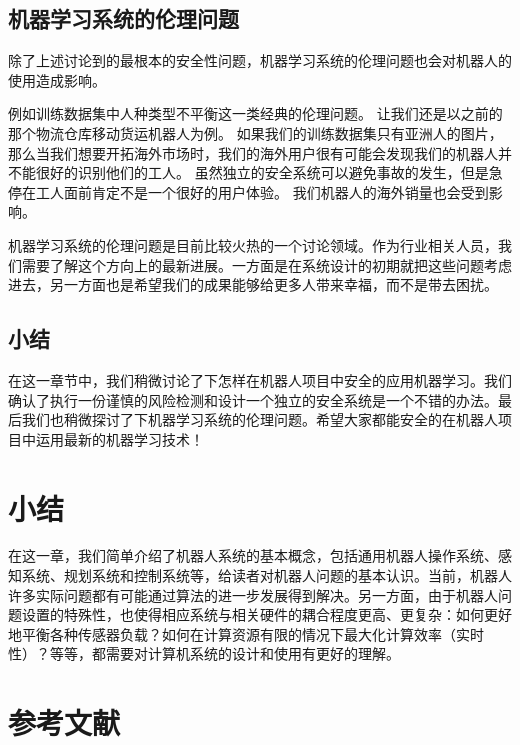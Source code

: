 \documentclass[letterpaper,10pt,english]{sphinxmanual}
\begin{document}
\subsection{机器学习系统的伦理问题}
\label{\detokenize{chapter_rl_sys/robot_safety:id5}}
\sphinxAtStartPar
除了上述讨论到的最根本的安全性问题，机器学习系统的伦理问题也会对机器人的使用造成影响。

\sphinxAtStartPar
例如训练数据集中人种类型不平衡这一类经典的伦理问题。
让我们还是以之前的那个物流仓库移动货运机器人为例。
如果我们的训练数据集只有亚洲人的图片，那么当我们想要开拓海外市场时，我们的海外用户很有可能会发现我们的机器人并不能很好的识别他们的工人。
虽然独立的安全系统可以避免事故的发生，但是急停在工人面前肯定不是一个很好的用户体验。
我们机器人的海外销量也会受到影响。

\sphinxAtStartPar
机器学习系统的伦理问题是目前比较火热的一个讨论领域。作为行业相关人员，我们需要了解这个方向上的最新进展。一方面是在系统设计的初期就把这些问题考虑进去，另一方面也是希望我们的成果能够给更多人带来幸福，而不是带去困扰。


\subsection{小结}
\label{\detokenize{chapter_rl_sys/robot_safety:id6}}
\sphinxAtStartPar
在这一章节中，我们稍微讨论了下怎样在机器人项目中安全的应用机器学习。我们确认了执行一份谨慎的风险检测和设计一个独立的安全系统是一个不错的办法。最后我们也稍微探讨了下机器学习系统的伦理问题。希望大家都能安全的在机器人项目中运用最新的机器学习技术！


\section{小结}
\label{\detokenize{chapter_rl_sys/summary:id1}}\label{\detokenize{chapter_rl_sys/summary::doc}}
\sphinxAtStartPar
在这一章，我们简单介绍了机器人系统的基本概念，包括通用机器人操作系统、感知系统、规划系统和控制系统等，给读者对机器人问题的基本认识。当前，机器人许多实际问题都有可能通过算法的进一步发展得到解决。另一方面，由于机器人问题设置的特殊性，也使得相应系统与相关硬件的耦合程度更高、更复杂：如何更好地平衡各种传感器负载？如何在计算资源有限的情况下最大化计算效率（实时性）？等等，都需要对计算机系统的设计和使用有更好的理解。


\section{参考文献}
\label{\detokenize{chapter_rl_sys/summary:id2}}
\sphinxAtStartPar
\end{document}
